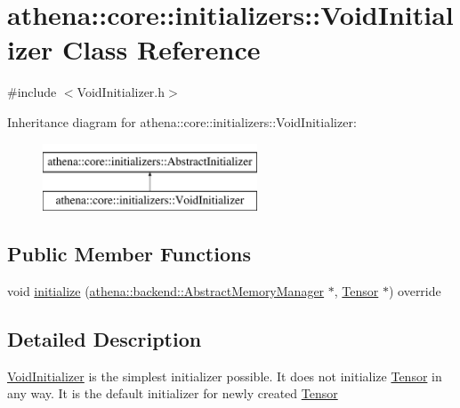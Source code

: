 \hypertarget{classathena_1_1core_1_1initializers_1_1_void_initializer}{}\section{athena\+:\+:core\+:\+:initializers\+:\+:Void\+Initializer Class Reference}
\label{classathena_1_1core_1_1initializers_1_1_void_initializer}


{\ttfamily \#include $<$Void\+Initializer.\+h$>$}

Inheritance diagram for athena\+:\+:core\+:\+:initializers\+:\+:Void\+Initializer\+:\begin{figure}[H]
\begin{center}
\leavevmode
\includegraphics[height=2.000000cm]{dd/de7/classathena_1_1core_1_1initializers_1_1_void_initializer}
\end{center}
\end{figure}
\subsection*{Public Member Functions}
\begin{DoxyCompactItemize}
\item 
void \mbox{\hyperlink{classathena_1_1core_1_1initializers_1_1_void_initializer_adcb637175e8cad5841cb21e53e0e138f}{initialize}} (\mbox{\hyperlink{classathena_1_1backend_1_1_abstract_memory_manager}{athena\+::backend\+::\+Abstract\+Memory\+Manager}} $\ast$, \mbox{\hyperlink{classathena_1_1core_1_1_tensor}{Tensor}} $\ast$) override
\end{DoxyCompactItemize}


\subsection{Detailed Description}
\mbox{\hyperlink{classathena_1_1core_1_1initializers_1_1_void_initializer}{Void\+Initializer}} is the simplest initializer possible. It does not initialize \mbox{\hyperlink{classathena_1_1core_1_1_tensor}{Tensor}} in any way. It is the default initializer for newly created \mbox{\hyperlink{classathena_1_1core_1_1_tensor}{Tensor}} 

